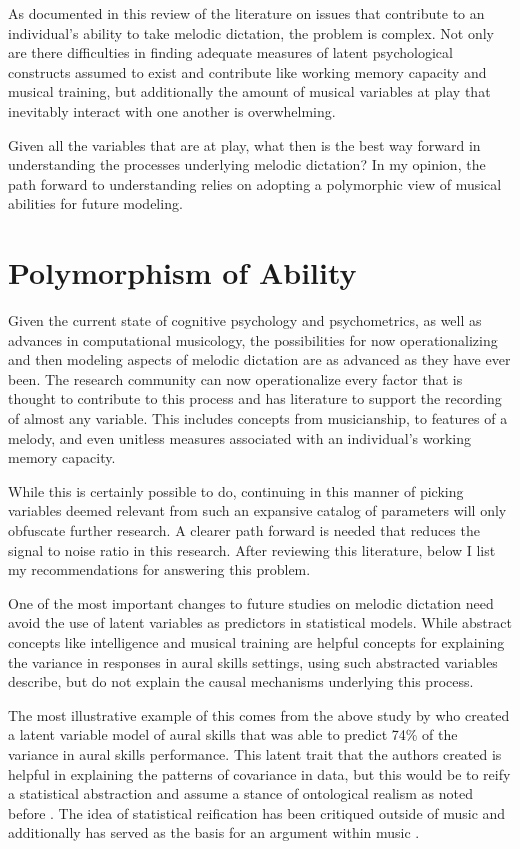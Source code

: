 \documentclass[12pt,]{book}
\begin{document}
As documented in this review of the literature on issues that contribute to an individual's ability to take melodic dictation, the problem is complex.
Not only are there difficulties in finding adequate measures of latent psychological constructs assumed to exist and contribute like working memory capacity and musical training, but additionally the amount of musical variables at play that inevitably interact with one another is overwhelming.

Given all the variables that are at play, what then is the best way forward in understanding the processes underlying melodic dictation?
In my opinion, the path forward to understanding relies on adopting a polymorphic view of musical abilities for future modeling.

\hypertarget{polymorphism-of-ability}{%
\section{Polymorphism of Ability}\label{polymorphism-of-ability}}

Given the current state of cognitive psychology and psychometrics, as well as advances in computational musicology, the possibilities for now operationalizing and then modeling aspects of melodic dictation are as advanced as they have ever been.
The research community can now operationalize every factor that is thought to contribute to this process and has literature to support the recording of almost any variable.
This includes concepts from musicianship, to features of a melody, and even unitless measures associated with an individual's working memory capacity.

While this is certainly possible to do, continuing in this manner of picking variables deemed relevant from such an expansive catalog of parameters will only obfuscate further research.
A clearer path forward is needed that reduces the signal to noise ratio in this research.
After reviewing this literature, below I list my recommendations for answering this problem.

One of the most important changes to future studies on melodic dictation need avoid the use of latent variables as predictors in statistical models.
While abstract concepts like intelligence and musical training are helpful concepts for explaining the variance in responses in aural skills settings, using such abstracted variables describe, but do not explain the causal mechanisms underlying this process.

The most illustrative example of this comes from the above study by \citet{harrisonEffectsMusicalAptitude1994} who created a latent variable model of aural skills that was able to predict 74\% of the variance in aural skills performance.
This latent trait that the authors created is helpful in explaining the patterns of covariance in data, but this would be to reify a statistical abstraction and assume a stance of ontological realism as noted before \citep{borsboomTheoreticalStatusLatent2003}.
The idea of statistical reification has been critiqued outside of music \citep{gouldMismeasureMan1996, kovacsProcessOverlapTheory2016} and additionally has served as the basis for an argument within music \citep{bakerExaminingMusicalSophistication2018a}.
\end{document}
